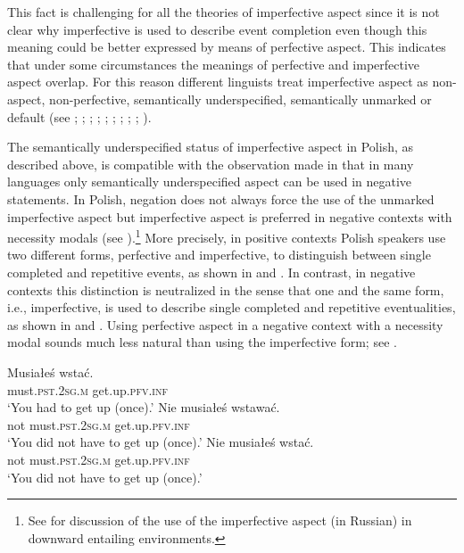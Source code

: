 \documentclass[output=paper]{langscibook}
\begin{document}
\noindent This fact is challenging for all the theories of imperfective aspect since it is not clear why imperfective is used to describe event completion even though this meaning could be better expressed by means of perfective aspect. This indicates that under some circumstances the meanings of perfective and imperfective aspect overlap. For this reason different linguists treat imperfective aspect as non-aspect, non-perfective, semantically underspecified, semantically unmarked or default (see \citealt{Battistella1990}; \citealt{Borik20022006}; \citealt{Comrie1976}; \citealt{Dahl1985}; \citealt{Filip19931999}; \citealt{Forsyth1970}; \citealt{Kagan2008, Kagan2010}; \citealt{Klein1995}; \citealt{PaslawskaandStechow2003}; \citealt{Willim2006}).

The semantically underspecified status of imperfective aspect in Polish, as described above, is compatible with the observation made in \citet{AikhenvaldandDixon1998} that in many languages only semantically underspecified aspect can be used in negative statements. In Polish, negation does not always force the use of the unmarked imperfective aspect but imperfective aspect is preferred in negative contexts with necessity modals (see \citealt{KlimekJankowskaCzypionkaWitkowskiandBłaszczak2018}).\footnote{See \citet{Kagan2008, Kagan2010} for discussion of the use of the imperfective aspect (in Russian) in downward entailing environments.}  More precisely, in positive contexts Polish speakers use two different forms, perfective and imperfective, to distinguish between single completed and repetitive events, as shown in  and . In contrast, in negative contexts this distinction is neutralized in the sense that one and the same form, i.e., imperfective, is used to describe single completed and repetitive eventualities, as shown in  and . Using perfective aspect in a negative context with a necessity modal sounds much less natural than using the imperfective form; see .

\ea\label{jan-bla:fansb:kb:ex8}
\ea \gll Musiałeś wstać.\\  
        must.\textsc{pst}.\textsc{2sg}.\textsc{m}  get.up.\textsc{pfv}.\textsc{inf}\\
\glt ‘You had to get up (once).’\label{jan-bla:fansb:kb:ex8a}
\ex \gll Nie musiałeś wstawać.\\  
        not must.\textsc{pst}.\textsc{2sg}.\textsc{m} get.up.\textsc{pfv}.\textsc{inf}\\
\glt ‘You did not have to get up (once).’\label{jan-bla:fansb:kb:ex8b}
\ex \gll Nie musiałeś wstać.\\  
        not must.\textsc{pst}.\textsc{2sg}.\textsc{m}  get.up.\textsc{pfv}.\textsc{inf}\\
\glt ‘You did not have to get up (once).’\label{jan-bla:fansb:kb:ex8c}
\z
\z
\end{document}

